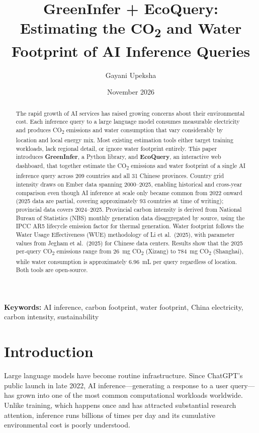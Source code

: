 \documentclass[11pt,a4paper]{article}
\title{\textbf{GreenInfer + EcoQuery: Estimating the CO\textsubscript{2} and Water
       Footprint of AI Inference Queries}}
\author{Gayani Upeksha}
\date{November 2026}
\begin{document}
\maketitle
\thispagestyle{empty}

\begin{abstract}
The rapid growth of AI services has raised growing concerns about their
environmental cost. Each inference query to a large language model consumes
measurable electricity and produces CO\textsubscript{2} emissions and water
consumption that vary considerably by location and local energy mix. Most
existing estimation tools either target training workloads, lack regional
detail, or ignore water footprint entirely. This paper introduces
\textbf{GreenInfer}, a Python library, and \textbf{EcoQuery}, an interactive
web dashboard, that together estimate the CO\textsubscript{2} emissions and
water footprint of a single AI inference query across 209 countries and
all 31 Chinese provinces. Country grid intensity draws on Ember data
spanning 2000--2025, enabling historical and cross-year comparison even
though AI inference at scale only became common from 2022 onward
(2025 data are partial, covering approximately 93 countries at time of writing);
provincial data covers 2024--2025. Provincial carbon
intensity is derived from National Bureau of Statistics (NBS) monthly
generation data disaggregated by source, using the IPCC AR5 lifecycle
emission factor for thermal generation. Water footprint follows the
Water Usage Effectiveness (WUE) methodology of Li et al.\ (2025), with
parameter values from Jegham et al.\ (2025) for Chinese data centers. Results show that the 2025 per-query CO\textsubscript{2} emissions range from
26~mg CO\textsubscript{2} (Xizang) to 784~mg CO\textsubscript{2} (Shanghai), while water consumption
is approximately 6.96~mL per query regardless of location. Both tools are open-source.
\end{abstract}

\vspace{1em}
\noindent\textbf{Keywords:} AI inference, carbon footprint, water footprint,
China electricity, carbon intensity, sustainability

\section{Introduction}

Large language models have become routine infrastructure. Since ChatGPT's
public launch in late 2022, AI inference---generating a response to a user
query---has grown into one of the most common computational workloads
worldwide. Unlike training, which happens once and has attracted substantial
research attention, inference runs billions of times per day and its
cumulative environmental cost is poorly understood.
\end{document}
